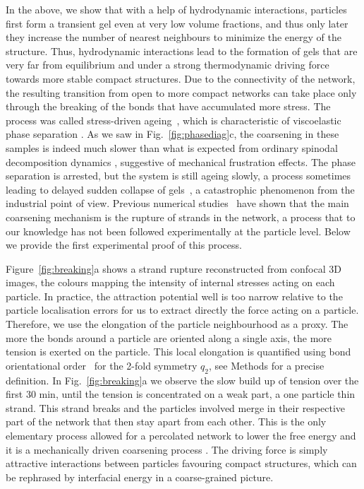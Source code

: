 \documentclass[preprint,footinbib,amsmath,amssymb]{revtex4}
\begin{document}
In the above, we show that with a help of hydrodynamic interactions, particles first form
a transient gel even at very low volume fractions, and thus only later they increase the number of
nearest neighbours to minimize the energy of the structure. 
Thus, hydrodynamic interactions lead to the formation of gels that are very far from equilibrium and under a strong thermodynamic driving force 
towards more stable compact structures. 
Due to the connectivity of the network, the resulting transition from open to more compact networks can take place only through
the breaking of the bonds that have accumulated more stress. The process was called stress-driven ageing~\cite{Tanaka2007}, 
which is characteristic of viscoelastic phase separation \cite{tanaka2000viscoelastic}. 
As we saw in Fig.~\ref{fig:phasediag}c, the coarsening in these samples is indeed much slower than what is expected from ordinary spinodal decomposition dynamics \cite{onuki2002phase}, 
suggestive of mechanical frustration effects. The phase separation is arrested, but the system is still ageing slowly, a process sometimes leading to delayed sudden collapse of gels~\cite{poon1999delayed,Bartlett2012}, a catastrophic phenomenon from the industrial point of view. Previous numerical studies~\cite{Tanaka2007,colombo2014self,testard2014intermittent} have shown that the main coarsening mechanism is the rupture of strands in the network, a process that to our knowledge has not been followed experimentally at the particle level.
Below we provide the first experimental proof of this process. 

Figure~\ref{fig:breaking}a shows a strand rupture reconstructed from confocal 3D images, the colours mapping the intensity of internal stresses acting on each particle. In practice, the attraction potential well is too narrow relative to the particle localisation errors for us to extract directly the force acting on a particle. Therefore, we use the elongation of the particle neighbourhood as a proxy. The more the bonds around a particle are oriented along a single axis, the more tension is exerted on the particle. This local elongation is quantified using bond orientational order~\cite{steinhardt1983boo} for the 2-fold symmetry $q_2$, see Methods for a precise definition. In Fig.~\ref{fig:breaking}a we observe the slow build up of tension over the first 30 min, until the tension is concentrated on a weak part, a one particle thin strand. This strand breaks and the particles involved merge in their respective part of the network that then stay apart from each other. This is the only elementary process allowed for a percolated network to lower the free energy and it is a mechanically driven coarsening process \cite{Tanaka2007}. The driving force is simply attractive interactions between particles favouring compact structures, which can be rephrased by 
interfacial energy in a coarse-grained picture. 
\end{document}
